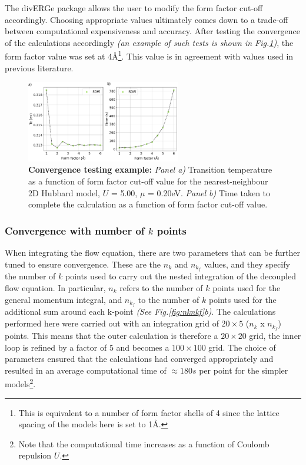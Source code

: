 \documentclass[11pt]{article}
\begin{document}
\medskip


\noindent The divERGe package allows the user to modify the form factor cut-off accordingly. Choosing appropriate values ultimately comes down to a trade-off 
between computational expensiveness and accuracy. 
After testing the convergence of the calculations accordingly \textit{(an example of 
such tests is shown in Fig.\ref{fig:Formfactorconvergence})},
the form factor value was set at 4\AA\footnote{This is equivalent to a number of form factor shells of 4 since the lattice spacing of the models here is set to 1\AA.}. 
This value is in agreement with values used in previous literature\cite{lichtenstein2018functional}. 

\begin{figure}[htbp]  %
    \centering
    \includegraphics[width=0.6\textwidth]{convergence.png}  %
    \caption{\textbf{Convergence testing example:} \textit{Panel a)} Transition temperature as a function of form factor cut-off value for the nearest-neighbour 2D Hubbard model, $U$ = 5.00, $\mu$ = 0.20eV. \textit{Panel b)} Time taken to complete the calculation
    as a function of form factor cut-off value.   }
    \label{fig:Formfactorconvergence}
\end{figure}




\subsubsection{Convergence with number of $k$ points }

When integrating the flow equation, there are two parameters that can be further tuned to ensure convergence.
These are the $n_k$ and $n_{k_f}$ values, and they specify the number of $k$ points used to carry out the nested integration of the decoupled flow equation. 
In particular, $n_k$ refers to the number of $k$ points used for the general momentum integral, and $n_{k_f}$ to the number of $k$ points used for 
the additional sum around each k-point \textit{(See Fig.\ref{fig:nknkf}b)}. The calculations performed here were carried out with an integration 
grid of $20 \times 5$ ($n_k$ x $n_{k_f}$) points. This means that the outer calculation is therefore a $20\times20$ grid, the inner loop is refined by a factor
of 5 and becomes a $100 \times 100$ grid. The choice of parameters ensured that the calculations had converged appropriately 
and resulted in an average computational time of $\approx 180s$ per point for the simpler models\footnote{Note that the computational time increases as a function of Coulomb repulsion $U$. }. 
\end{document}
